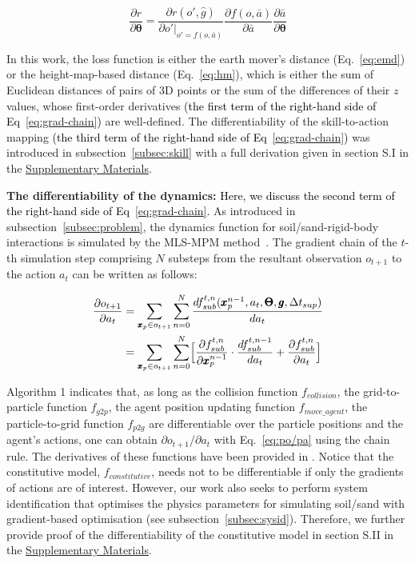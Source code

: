 \documentclass[letterpaper, 10 pt, journal, twoside]{ieeetran}
\newcommand{\rp}[1]{\textcolor{black}{#1}}
\newcommand{\supmat}{\href{https://github.com/IanYangChina/DDBot/blob/main/DDBot_supplementary.pdf}{Supplementary Materials}}
\begin{document}
\begin{equation}
\frac{\partial r}{\partial \pmb{\theta}} = \frac{\partial r(o', \hat{g})}{\partial o'|_{o'=f(o,\bar{a})}}\frac{\partial f(o,\bar{a})}{\partial \bar{a}}\frac{\partial \bar{a}}{\partial \pmb{\theta}}\label{eq:grad-chain}
\end{equation}
 
In this work, the loss function is either the earth mover's distance (Eq.~\ref{eq:emd}) or the height-map-based distance (Eq.~\ref{eq:hm}), which is either the sum of Euclidean distances of pairs of 3D points or the sum of the differences of their $z$ values, whose first-order derivatives \rp{(the first term of the right-hand side of Eq~\ref{eq:grad-chain})} are well-defined. The differentiability of the skill-to-action mapping \rp{(the third term of the right-hand side of Eq~\ref{eq:grad-chain})} was introduced in subsection~\ref{subsec:skill} with a full derivation given in section S.I in the \supmat.

\textbf{The differentiability of the dynamics:} \rp{Here, we discuss the second term of the right-hand side of Eq~\ref{eq:grad-chain}.} As introduced in subsection~\ref{subsec:problem}, the dynamics function for soil/sand-rigid-body interactions is simulated by the MLS-MPM method~\cite{hu2018moving}. 
The gradient chain of the $t$-th simulation step comprising $N$ substeps from the resultant observation $o_{t+1}$ to the action $a_t$ can be written as follows:

\begin{equation}\label{eq:po/pa}
\begin{split}
\frac{\partial o_{t+1}}{\partial a_t} 
&=\sum_{\pmb{x}_p\in o_{t+1}}\sum_{n=0}^N\frac{df_{sub}^{t,n}(\pmb{x}^{n-1}_p, a_t, \pmb{\Theta}, \pmb{g}, \Delta t_{sup})}{da_t}\\
&= \sum_{\pmb{x}_p\in o_{t+1}}\sum_{n=0}^N\Bigl[
\frac{\partial f_{sub}^{t,n}}{\partial \pmb{x}_p^{n-1}}\cdot
\frac{d f_{sub}^{t,n-1}}{d a_t} 
+ \frac{\partial f_{sub}^{t,n}}{\partial a_t}
\Bigr]    
\end{split}
\end{equation}

Algorithm 1 indicates that, as long as the collision function $f_{collision}$, the grid-to-particle function $f_{g2p}$, the agent position updating function $f_{move\_agent}$, the particle-to-grid function $f_{p2g}$ are differentiable over the particle positions and the agent's actions, one can obtain $\partial o_{t+1}/\partial a_t$ with Eq.~\ref{eq:po/pa} using the chain rule. The derivatives of these functions have been provided in \cite{hu2019chainqueen}. Notice that the constitutive model, $f_{constitutive}$, needs not to be differentiable if only the gradients of actions are of interest. However, our work also seeks to perform system identification that optimises the physics parameters for simulating soil/sand with gradient-based optimisation (see subsection~\ref{subsec:sysid}). Therefore, we further provide proof of the differentiability of the constitutive model in section S.II in the \supmat.
\end{document}
